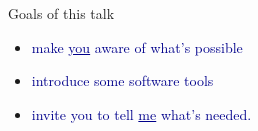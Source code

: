 \documentclass{beamer}
\begin{document}
\begin{frame}{}


\end{frame}

\begin{frame}{Goals of this talk}
\Large
\begin{itemize}\setlength{\itemsep}{0.5 cm}
\item \textcolor{darkblue}{make \underline{you} aware of what's possible}
\item \textcolor{darkblue}{introduce some software tools}
\item \textcolor{darkblue}{invite you to tell \underline{me} what's needed.}
\end{itemize}
\end{frame}
\end{document}
